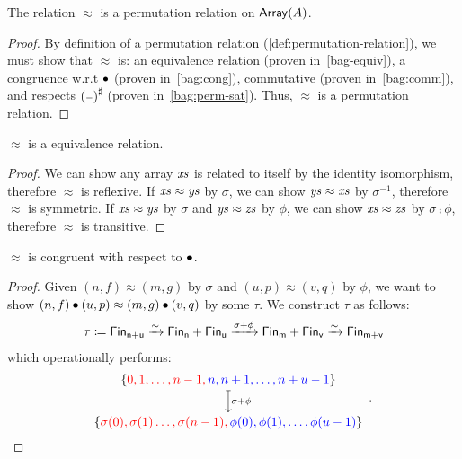 \begin{propositionrep}
    \label{prop:bag-is-perm-relation}
    The relation $\approx$ is a permutation relation on $\operatorname{\mathsf{Array}}(A)$.
\end{propositionrep}
\begin{proof}
    By definition of a permutation relation (\cref{def:permutation-relation}), we must show that $\approx$ is:
    an equivalence relation (proven in~\cref{bag-equiv}),
    a congruence w.r.t $\mathbin{\bullet}$ (proven in~\cref{bag:cong}),
    commutative (proven in~\cref{bag:comm}), and
    respects $\ext{(\blank)}$ (proven in~\cref{bag:perm-sat}).
    Thus, $\approx$ is a permutation relation.
\end{proof}
%
\begin{toappendix}
    \label{bag-equiv}
    \begin{proposition}
        $\approx$ is a equivalence relation.
    \end{proposition}
    \begin{proof}
        We can show any array $\mathit{xs}$ is related to itself by the identity isomorphism, therefore $\approx$ is reflexive.
        If $\mathit{xs} \approx \mathit{ys}$ by $\sigma$, we can show $\mathit{ys} \approx \mathit{xs}$ by $\sigma^{-1}$, therefore $\approx$ is symmetric.
        If $\mathit{xs} \approx \mathit{ys}$ by $\sigma$ and $\mathit{ys} \approx \mathit{zs}$ by $\phi$, we can show $\mathit{xs} \approx \mathit{zs}$ by $\sigma \comp \phi$,
        therefore $\approx$ is transitive.
    \end{proof}
\end{toappendix}
%
\begin{proposition}
    \label{bag:cong}
    $\approx$ is congruent with respect to $\mathbin{\bullet}$.
\end{proposition}
%
\begin{proof}
    Given $(n, f) \approx (m, g)$ by $\sigma$ and $(u, p) \approx (v, q)$ by $\phi$,
    we want to show $(n, f) \mathbin{\bullet} (u, p) \approx (m, g) \mathbin{\bullet} (v, q)$ by some $\tau$.
    We construct $\tau$ as follows:
    \[
        \tau \defeq \Fin[n+u] \xto{\sim} \Fin[n] + \Fin[u] \xto{\sigma + \phi} \Fin[m] + \Fin[v] \xto{\sim} \Fin[m+v] \\
    \]
    which operationally performs:
    \[
        \begin{tikzcd}[ampersand replacement=\&,cramped]
            {\{\color{red}0,1,\dots,n-1, \color{blue} n,n+1,\dots,n+u-1 \color{black}\}} \\
            { \{\color{red}\sigma(0),\sigma(1)\dots,\sigma(n-1), \color{blue}\phi(0),\phi(1),\dots,\phi(u-1) \color{black}\}}
            \arrow["{\sigma+\phi}", maps to, from=1-1, to=2-1]
        \end{tikzcd}
        \enspace.
    \]
\end{proof}
